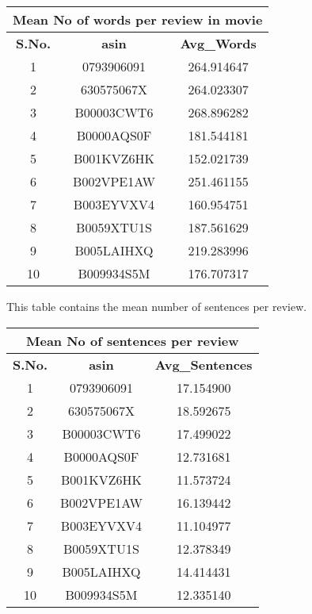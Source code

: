 \documentclass[conference]{IEEEtran}
\begin{document}
\begin{center}
 \begin{tabular}{|c | c | c|} 
 \hline
 \multicolumn{3}{|c|}{Mean No of words per review in movie} \\
 \hline
 \bfseries S.No. &\bfseries asin &\bfseries Avg\_Words \\ [0.5ex] 
 \hline
 1 & 0793906091 & 264.914647\\ 
 \hline
 2 & 630575067X & 264.023307\\
 \hline
 3 & B00003CWT6 & 268.896282\\
 \hline
 4 & B0000AQS0F & 181.544181\\
 \hline
 5 & B001KVZ6HK & 152.021739\\ 
 \hline
 6 & B002VPE1AW & 251.461155\\ 
 \hline
 7 & B003EYVXV4 & 160.954751\\
 \hline
 8 & B0059XTU1S & 187.561629\\
 \hline
 9 & B005LAIHXQ & 219.283996\\
 \hline
 10 & B009934S5M & 176.707317\\[1ex] 
 \hline
\end{tabular}
\end{center}
\vspace{8mm}

This table contains the mean number of sentences per review.

\begin{center}
 \begin{tabular}{|c | c | c|} 
 \hline
 \multicolumn{3}{|c|}{Mean No of sentences per review} \\
 \hline
 \bfseries S.No. &\bfseries asin &\bfseries Avg\_Sentences \\ [0.5ex] 
 \hline
 1 & 0793906091 & 17.154900\\ 
 \hline
 2 & 630575067X & 18.592675\\
 \hline
 3 & B00003CWT6 & 17.499022\\
 \hline
 4 & B0000AQS0F & 12.731681\\
 \hline
 5 & B001KVZ6HK & 11.573724\\ 
 \hline
 6 & B002VPE1AW & 16.139442\\ 
 \hline
 7 & B003EYVXV4 & 11.104977\\
 \hline
 8 & B0059XTU1S & 12.378349\\
 \hline
 9 & B005LAIHXQ & 14.414431\\
 \hline
 10 & B009934S5M & 12.335140\\[1ex] 
 \hline
\end{tabular}
\end{center}
\end{document}
